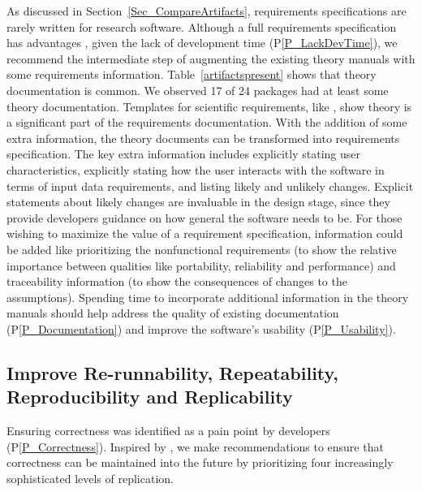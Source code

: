\documentclass[final, 3p, times, authoryear]{elsarticle}
\newcommand{\ppref}[1]{P\ref{#1}}
\begin{document}
As discussed in Section~\ref{Sec_CompareArtifacts}, requirements specifications
are rarely written for research software. Although a full requirements
specification has advantages \citep{SmithEtAl2007, SmithAndLai2005},
given the lack of development time (\ppref{P_LackDevTime}), we recommend the
intermediate step of augmenting the existing theory manuals with some
requirements information.  Table~\ref{artifactspresent} shows that theory
documentation is common.  We observed 17 of 24 packages had at least some theory
documentation. Templates for scientific requirements, like \citet{SmithEtAl2007,
SmithAndLai2005}, show theory is a significant part of the requirements
documentation. With the addition of some extra information, the theory documents
can be transformed into requirements specification.  The key extra information
includes explicitly stating user characteristics, explicitly stating how the
user interacts with the software in terms of input data requirements, and
listing likely and unlikely changes.  Explicit statements about likely changes
are invaluable in the design stage, since they provide developers guidance on
how general the software needs to be.  For those wishing to maximize the value
of a requirement specification, information could be added like prioritizing the
nonfunctional requirements (to show the relative importance between qualities
like portability, reliability and performance) and traceability information (to
show the consequences of changes to the assumptions). Spending time to
incorporate additional information in the theory manuals should help address the
quality of existing documentation (\ppref{P_Documentation})  and improve the
software's usability (\ppref{P_Usability}).

\subsection{Improve Re-runnability, Repeatability, Reproducibility and Replicability} 
\label{Sec_Reproducibility}

Ensuring correctness was identified as a pain point by developers
(\ppref{P_Correctness}).  Inspired by \citet{BenureauAndRougier2017}, we make
recommendations to ensure that correctness can be maintained into the future by
prioritizing four increasingly sophisticated levels of replication.
\end{document}
